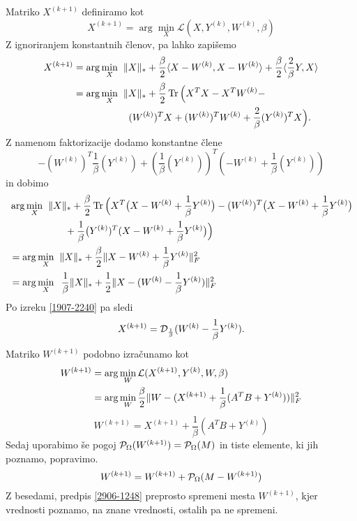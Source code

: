 Matriko $X^{(k+1)}$ definiramo kot
\[
    X^{(k+1)} = \arg \min_X \mathcal{L}(X, Y^{(k)}, W^{(k)}, \beta)
\]
Z ignoriranjem konstantnih členov, pa lahko zapišemo
\begin{align*}
    X^{(k+1)} & = \arg \min_X \hspace{0.2cm} \lVert X\rVert_* + \frac{\beta}{2}\langle X-W^{(k)}, X-W^{(k)} \rangle + \frac{\beta}{2}\langle \frac{2}{\beta}Y, X \rangle       \\
            & = \arg \min_X \hspace{0.2cm} \lVert X\rVert_* + \frac{\beta}{2}\operatorname{Tr}\Big(X^TX - X^TW^{(k)} -\\
            &\hspace{2cm} (W^{(k)})^TX + (W^{(k)})^TW^{(k)} + \frac{2}{\beta}(Y^{(k)})^TX \Big).
\end{align*}
Z namenom faktorizacije dodamo konstantne člene 
\[-(W^{(k)})^T\frac{1}{\beta}(Y^{(k)}) + (\frac{1}{\beta}(Y^{(k)}))^T(-W^{(k)} + \frac{1}{\beta}(Y^{(k)}))\] 
in dobimo
\begin{align*}
     & \arg \min_X \hspace{0.2cm} \lVert X\rVert_* + \frac{\beta}{2}\operatorname{Tr}\Big(X^T\big(X - W^{(k)} + \frac{1}{\beta}Y^{(k)}\big) - (W^{(k)})^T \big(X - W^{(k)} + \frac{1}{\beta}Y^{(k)}\big) \\
     &\hspace{2cm} +\frac{1}{\beta}\big(Y^{(k)})^T(X - W^{(k)} + \frac{1}{\beta}Y^{(k)}\big)\Big)                                                               \\
     & = \arg \min_X \hspace{0.2cm} \lVert X\rVert_* + \frac{\beta}{2} \lVert X-W^{(k)} + \frac{1}{\beta}Y^{(k)}\rVert_F^2                                       \\
     & = \arg \min_X \hspace{0.2cm} \frac{1}{\beta}\lVert X\rVert_* +  \frac{1}{2}\lVert X-(W^{(k)} - \frac{1}{\beta}Y^{(k)})\rVert_F^2
\end{align*}
Po izreku \ref{1907-2240}  pa sledi
\[
    X^{(k+1)} = \mathcal{D}_\frac{1}{\beta}(W^{(k)} - \frac{1}{\beta} Y^{(k)}).
\]
Matriko $W^{(k+1)}$ podobno izračunamo kot
\begin{align*}
    W^{(k+1)} & = \arg \min_{W} \mathcal{L}(X^{(k+1)}, Y^{(k)}, W, \beta)                                       \\
            & = \arg \min_W \frac{\beta}{2} \lVert W - (X^{(k+1)} + \frac{1}{\beta}(A^T B + Y^{(k)})) \rVert_F^2
\end{align*}
\[
    W^{(k+1)} = X^{(k+1)} + \frac{1}{\beta}(A^T B + Y^{(k)})
\]
Sedaj uporabimo še pogoj $\mathcal{P}_\Omega(W^{(k+1)}) = \mathcal{P}_\Omega(M)$ in tiste elemente, ki jih poznamo, popravimo.
\begin{equation}
    \label{2906-1248}
    W^{(k+1)} = W^{(k+1)} + \mathcal{P}_\Omega(M - W^{(k+1)})
\end{equation}
Z besedami, predpis \eqref{2906-1248}
preprosto spremeni mesta $W^{(k+1)}$, kjer vrednosti poznamo, na znane vrednosti, ostalih pa ne spremeni.
